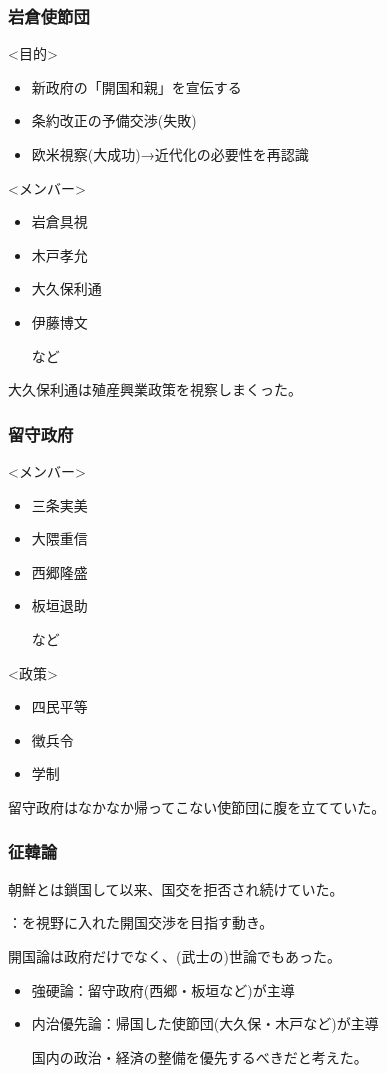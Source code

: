\documentclass[12pt,fleqn]{ltjsarticle}
\begin{document}
\subsubsection{岩倉使節団}
<目的>
\begin{itemize}
\item 新政府の「開国和親」を宣伝する
\item 条約改正の予備交渉(失敗)
\item 欧米視察(大成功)→近代化の必要性を再認識
\end{itemize}
<メンバー>
\begin{itemize}
\item 岩倉具視
\item 木戸孝允
\item 大久保利通
\item 伊藤博文

など
\end{itemize}
大久保利通は殖産興業政策を視察しまくった。

\subsubsection{留守政府}
<メンバー>
\begin{itemize}
\item 三条実美
\item 大隈重信
\item 西郷隆盛
\item 板垣退助

など
\end{itemize}
<政策>
\begin{itemize}
\item 四民平等
\item 徴兵令
\item 学制
\end{itemize}
留守政府はなかなか帰ってこない使節団に腹を立てていた。

\subsubsection{征韓論}
朝鮮とは鎖国して以来、国交を拒否され続けていた。

：を視野に入れた開国交渉を目指す動き。

開国論は政府だけでなく、(武士の)世論でもあった。

\begin{itemize}
\item 強硬論：留守政府(西郷・板垣など)が主導
\item 内治優先論：帰国した使節団(大久保・木戸など)が主導

国内の政治・経済の整備を優先するべきだと考えた。
\end{itemize}
\end{document}
